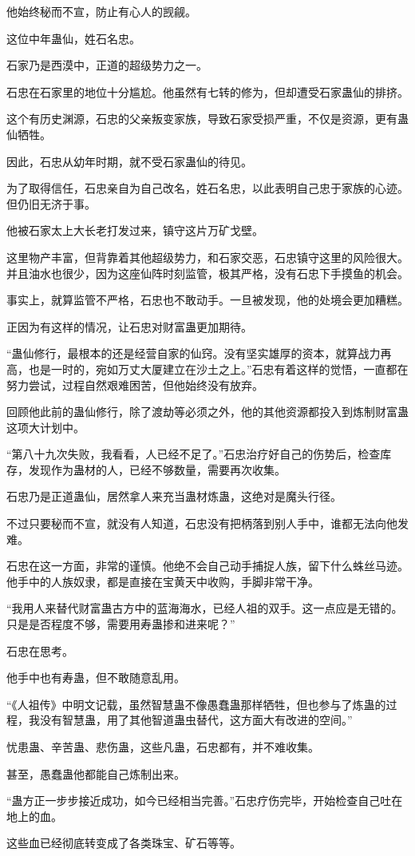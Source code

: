 \begin{this_body}
他始终秘而不宣，防止有心人的觊觎。

这位中年蛊仙，姓石名忠。

石家乃是西漠中，正道的超级势力之一。

石忠在石家里的地位十分尴尬。他虽然有七转的修为，但却遭受石家蛊仙的排挤。

这个有历史渊源，石忠的父亲叛变家族，导致石家受损严重，不仅是资源，更有蛊仙牺牲。

因此，石忠从幼年时期，就不受石家蛊仙的待见。

为了取得信任，石忠亲自为自己改名，姓石名忠，以此表明自己忠于家族的心迹。但仍旧无济于事。

他被石家太上大长老打发过来，镇守这片万矿戈壁。

这里物产丰富，但背靠着其他超级势力，和石家交恶，石忠镇守这里的风险很大。并且油水也很少，因为这座仙阵时刻监管，极其严格，没有石忠下手摸鱼的机会。

事实上，就算监管不严格，石忠也不敢动手。一旦被发现，他的处境会更加糟糕。

正因为有这样的情况，让石忠对财富蛊更加期待。

“蛊仙修行，最根本的还是经营自家的仙窍。没有坚实雄厚的资本，就算战力再高，也是一时的，宛如万丈大厦建立在沙土之上。”石忠有着这样的觉悟，一直都在努力尝试，过程自然艰难困苦，但他始终没有放弃。

回顾他此前的蛊仙修行，除了渡劫等必须之外，他的其他资源都投入到炼制财富蛊这项大计划中。

“第八十九次失败，我看看，人已经不足了。”石忠治疗好自己的伤势后，检查库存，发现作为蛊材的人，已经不够数量，需要再次收集。

石忠乃是正道蛊仙，居然拿人来充当蛊材炼蛊，这绝对是魔头行径。

不过只要秘而不宣，就没有人知道，石忠没有把柄落到别人手中，谁都无法向他发难。

石忠在这一方面，非常的谨慎。他绝不会自己动手捕捉人族，留下什么蛛丝马迹。他手中的人族奴隶，都是直接在宝黄天中收购，手脚非常干净。

“我用人来替代财富蛊古方中的蓝海海水，已经人祖的双手。这一点应是无错的。只是是否程度不够，需要用寿蛊掺和进来呢？”

石忠在思考。

他手中也有寿蛊，但不敢随意乱用。

“《人祖传》中明文记载，虽然智慧蛊不像愚蠢蛊那样牺牲，但也参与了炼蛊的过程，我没有智慧蛊，用了其他智道蛊虫替代，这方面大有改进的空间。”

忧患蛊、辛苦蛊、悲伤蛊，这些凡蛊，石忠都有，并不难收集。

甚至，愚蠢蛊他都能自己炼制出来。

“蛊方正一步步接近成功，如今已经相当完善。”石忠疗伤完毕，开始检查自己吐在地上的血。

这些血已经彻底转变成了各类珠宝、矿石等等。

\end{this_body}

